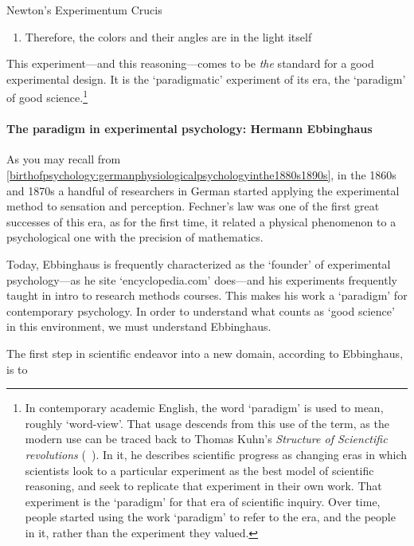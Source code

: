 \begin{refsection}
\begin{apatextbox}{Newton's Experimentum Crucis}
\begin{enumerate}
\item Therefore, the colors and their angles are in the light itself 

\end{enumerate}

\end{apatextbox}

This experiment---and this reasoning---comes to be \emph{the} standard for a good experimental design. It is the `paradigmatic' experiment of its era, the `paradigm' of good science.\footnote{In contemporary academic English, the word `paradigm' is used to mean, roughly `word-view'. That usage descends from this use of the term, as the modern use can be traced back to Thomas Kuhn's \emph{Structure of Scienctific revolutions} (~\citep{Kuhn:2012vq}). In it, he describes scientific progress as changing eras in which scientists look to a particular experiment as the best model of scientific reasoning, and seek to replicate that experiment in their own work. That experiment is the `paradigm' for that era of scientific inquiry. Over time, people started using the work `paradigm' to refer to the era, and the people in it, rather than the experiment they valued.} 

\paragraph{The paradigm in experimental psychology: Hermann Ebbinghaus}
\label{theparadigminexperimentalpsychology:hermannebbinghaus}

As you may recall from \ref{birthofpsychology:germanphysiologicalpsychologyinthe1880s1890s}, in the 1860s and 1870s a handful of researchers in German started applying the experimental method to sensation and perception. Fechner's law was one of the first great successes of this era, as for the first time, it related a physical phenomenon to a psychological one with the precision of mathematics. 

Today, Ebbinghaus is frequently characterized as the `founder' of experimental psychology---as he site `encyclopedia.com' does---and his experiments frequently taught in intro to research methods courses. This makes his work a `paradigm' for contemporary psychology. In order to understand what counts as `good science' in this environment, we must understand Ebbinghaus.

The first step in scientific endeavor into a new domain, according to Ebbinghaus, is to 

\begin{quote}


\end{quote}
\end{refsection}
